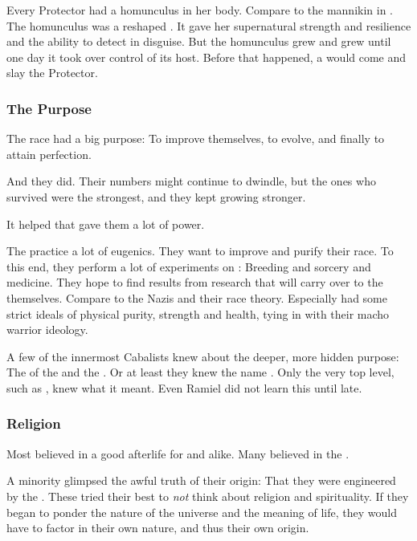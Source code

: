 Every Protector had a homunculus in her body. 
Compare to the mannikin in \cite{RobertBloch:TheMannikin}.
The homunculus was a reshaped .
It gave her supernatural strength and resilience and the ability to detect \mothlain in disguise.
But the homunculus grew and grew until one day it took over control of its host. 
Before that happened, a  would come and slay the Protector.





\subsubsection{The Purpose}
The \resphan{} race had a big purpose: 
To improve themselves, to evolve, and finally to attain perfection. 

And they did. 
Their numbers might continue to dwindle, but the ones who survived were the strongest, and they kept growing stronger. 

It helped that \iquin{} gave them a lot of power. 

The \resphain practice a lot of eugenics.
They want to improve and purify their race. 
To this end, they perform a lot of experiments on \humans:
Breeding and sorcery and medicine. 
They hope to find results from \human research that will carry over to the \resphain themselves. 
Compare to the Nazis and their race theory. 
Especially \Mystraacht had some strict ideals of physical purity, strength and health, tying in with their macho warrior ideology.

A few of the innermost Cabalists knew about the deeper, more hidden purpose: 
The  of the \baneking \Voidbringer and the \noggyal {}.
Or at least they knew the name . 
Only the very top level, such as \Azraid, knew what it meant.
Even Ramiel did not learn this until late. 





\subsubsection{Religion}
Most \resphain believed in a good afterlife for \resphain and \humans alike.
Many believed in the . 

A minority glimpsed the awful truth of their origin: 
That they were engineered by the \banes.
These tried their best to \emph{not} think about religion and spirituality. 
If they began to ponder the nature of the universe and the meaning of life, they would have to factor in their own nature, and thus their own origin.

